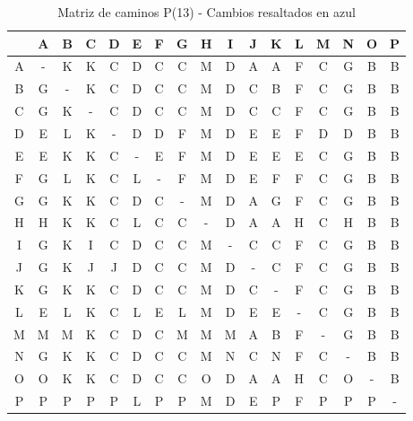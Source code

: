 \documentclass[12pt]{article}
\begin{document}
\begin{table}[h!]
\centering
\begin{tabular}{|c|c|c|c|c|c|c|c|c|c|c|c|c|c|c|c|c|}
\hline
 & A & B & C & D & E & F & G & H & I & J & K & L & M & N & O & P \\\hline
A & - & K & K & C & D & C & C & \cellcolor{lightblue} M & D & A & A & F & C & G & B & B \\\hline
B & G & - & K & C & D & C & C & \cellcolor{lightblue} M & D & C & B & F & C & G & B & B \\\hline
C & G & K & - & C & D & C & C & \cellcolor{lightblue} M & D & C & C & F & C & G & B & B \\\hline
D & E & L & K & - & D & D & F & \cellcolor{lightblue} M & D & E & E & F & D & D & B & B \\\hline
E & E & K & K & C & - & E & F & \cellcolor{lightblue} M & D & E & E & E & C & G & B & B \\\hline
F & G & L & K & C & L & - & F & \cellcolor{lightblue} M & D & E & F & F & C & G & B & B \\\hline
G & G & K & K & C & D & C & - & \cellcolor{lightblue} M & D & A & G & F & C & G & B & B \\\hline
H & H & K & K & C & L & C & C & - & D & A & A & H & C & H & B & B \\\hline
I & G & K & I & C & D & C & C & \cellcolor{lightblue} M & - & C & C & F & C & G & B & B \\\hline
J & G & K & J & J & D & C & C & \cellcolor{lightblue} M & D & - & C & F & C & G & B & B \\\hline
K & G & K & K & C & D & C & C & \cellcolor{lightblue} M & D & C & - & F & C & G & B & B \\\hline
L & E & L & K & C & L & E & L & \cellcolor{lightblue} M & D & E & E & - & C & G & B & B \\\hline
M & M & M & K & C & D & C & M & M & M & A & B & F & - & G & B & B \\\hline
N & G & K & K & C & D & C & C & \cellcolor{lightblue} M & N & C & N & F & C & - & B & B \\\hline
O & O & K & K & C & D & C & C & O & D & A & A & H & C & O & - & B \\\hline
P & P & P & P & P & L & P & P & \cellcolor{lightblue} M & D & E & P & F & P & P & P & - \\\hline
\end{tabular}
\caption{Matriz de caminos P(13) - Cambios resaltados en azul}
\end{table}
\end{document}
